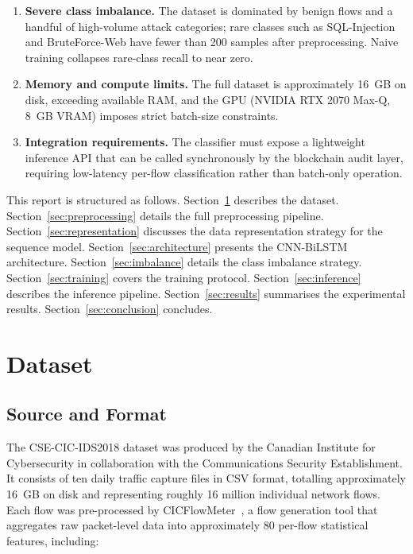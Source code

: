 \documentclass[12pt]{article}
\theoremstyle{plain}
\begin{document}
\begin{enumerate}
    \item \textbf{Severe class imbalance.} The dataset is dominated by benign flows and a handful of high-volume attack categories; rare classes such as SQL-Injection and BruteForce-Web have fewer than 200 samples after preprocessing. Naive training collapses rare-class recall to near zero.
    \item \textbf{Memory and compute limits.} The full dataset is approximately 16~GB on disk, exceeding available RAM, and the GPU (NVIDIA RTX 2070 Max-Q, 8~GB VRAM) imposes strict batch-size constraints.
    \item \textbf{Integration requirements.} The classifier must expose a lightweight inference API that can be called synchronously by the blockchain audit layer, requiring low-latency per-flow classification rather than batch-only operation.
\end{enumerate}

This report is structured as follows. Section~\ref{sec:dataset} describes the dataset. Section~\ref{sec:preprocessing} details the full preprocessing pipeline. Section~\ref{sec:representation} discusses the data representation strategy for the sequence model. Section~\ref{sec:architecture} presents the CNN-BiLSTM architecture. Section~\ref{sec:imbalance} details the class imbalance strategy. Section~\ref{sec:training} covers the training protocol. Section~\ref{sec:inference} describes the inference pipeline. Section~\ref{sec:results} summarises the experimental results. Section~\ref{sec:conclusion} concludes.

\newpage

\section{Dataset}
\label{sec:dataset}

\subsection{Source and Format}

The CSE-CIC-IDS2018 dataset \cite{CIC2018} was produced by the Canadian Institute for Cybersecurity in collaboration with the Communications Security Establishment. It consists of ten daily traffic capture files in CSV format, totalling approximately 16~GB on disk and representing roughly 16 million individual network flows. Each flow was pre-processed by CICFlowMeter~\cite{CICFlowMeter}, a flow generation tool that aggregates raw packet-level data into approximately 80 per-flow statistical features, including:
\end{document}
